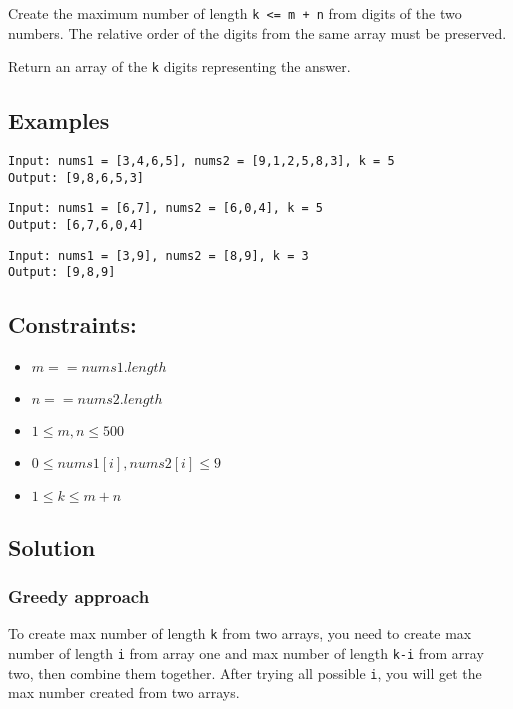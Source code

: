 \documentclass[11pt]{article}
\begin{document}
Create the maximum number of length \texttt{k <= m + n} from digits of the two numbers. The relative order of the digits from the same array must be preserved.

Return an array of the \texttt{k} digits representing the answer.

\subsection{Examples}
\label{sec:org59c3dc2}

\begin{verbatim}
Input: nums1 = [3,4,6,5], nums2 = [9,1,2,5,8,3], k = 5
Output: [9,8,6,5,3]
\end{verbatim}

\begin{verbatim}
Input: nums1 = [6,7], nums2 = [6,0,4], k = 5
Output: [6,7,6,0,4]
\end{verbatim}

\begin{verbatim}
Input: nums1 = [3,9], nums2 = [8,9], k = 3
Output: [9,8,9]
\end{verbatim}


\subsection{Constraints:}
\label{sec:orgb50ad52}
\begin{itemize}
\item \(m == nums1.length\)
\item \(n == nums2.length\)
\item \(1 \le m, n \le 500\)
\item \(0 \le nums1[i], nums2[i] \le 9\)
\item \(1 \le k \le m + n\)
\end{itemize}


\subsection{Solution}
\label{sec:org3c89928}
\subsubsection{Greedy approach}
\label{sec:org437b043}
To create max number of length \texttt{k} from two arrays, you need to create max number of length \texttt{i} from array one and max number of length \texttt{k-i} from array two, then combine them together. After trying all possible \texttt{i}, you will get the max number created from two arrays.
\end{document}

